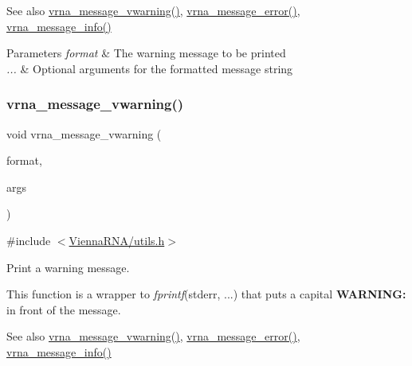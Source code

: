 \begin{DoxySeeAlso}{See also}
\mbox{\hyperlink{group__utils_ga377aa8ec8a49d343063adb22e6311f26}{vrna\+\_\+message\+\_\+vwarning()}}, \mbox{\hyperlink{group__utils_ga36b35be01d7f36cf7f59c245eee628d1}{vrna\+\_\+message\+\_\+error()}}, \mbox{\hyperlink{group__utils_ga039bae6153a6415b054dbe6045f83d03}{vrna\+\_\+message\+\_\+info()}}
\end{DoxySeeAlso}

\begin{DoxyParams}{Parameters}
{\em format} & The warning message to be printed \\
\hline
{\em ...} & Optional arguments for the formatted message string \\
\hline
\end{DoxyParams}
\mbox{\label{group__utils_ga377aa8ec8a49d343063adb22e6311f26}} 
\subsubsection{\texorpdfstring{vrna\+\_\+message\+\_\+vwarning()}{vrna\_message\_vwarning()}}
{\footnotesize\ttfamily void vrna\+\_\+message\+\_\+vwarning (\begin{DoxyParamCaption}\item[{const char $\ast$}]{format,  }\item[{va\+\_\+list}]{args }\end{DoxyParamCaption})}



{\ttfamily \#include $<$\mbox{\hyperlink{utils_8h}{Vienna\+R\+N\+A/utils.\+h}}$>$}



Print a warning message. 

This function is a wrapper to {\itshape fprintf}(stderr, ...) that puts a capital {\bfseries W\+A\+R\+N\+I\+NG\+:} in front of the message.

\begin{DoxySeeAlso}{See also}
\mbox{\hyperlink{group__utils_ga377aa8ec8a49d343063adb22e6311f26}{vrna\+\_\+message\+\_\+vwarning()}}, \mbox{\hyperlink{group__utils_ga36b35be01d7f36cf7f59c245eee628d1}{vrna\+\_\+message\+\_\+error()}}, \mbox{\hyperlink{group__utils_ga039bae6153a6415b054dbe6045f83d03}{vrna\+\_\+message\+\_\+info()}}
\end{DoxySeeAlso}

